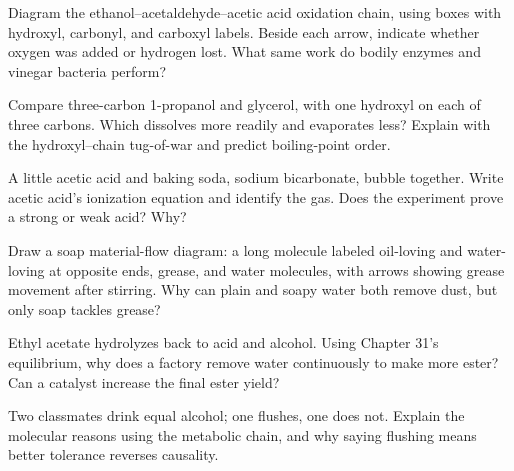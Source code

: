 \begin{sikaoti}
\item Diagram the ethanol--acetaldehyde--acetic acid oxidation chain, using boxes with hydroxyl, carbonyl, and carboxyl labels. Beside each arrow, indicate whether oxygen was added or hydrogen lost. What same work do bodily enzymes and vinegar bacteria perform?
\item Compare three-carbon 1-propanol and glycerol, with one hydroxyl on each of three carbons. Which dissolves more readily and evaporates less? Explain with the hydroxyl--chain tug-of-war and predict boiling-point order.
\item A little acetic acid and baking soda, sodium bicarbonate, bubble together. Write acetic acid's ionization equation and identify the gas. Does the experiment prove a strong or weak acid? Why?
\item Draw a soap material-flow diagram: a long molecule labeled oil-loving and water-loving at opposite ends, grease, and water molecules, with arrows showing grease movement after stirring. Why can plain and soapy water both remove dust, but only soap tackles grease?
\item Ethyl acetate hydrolyzes back to acid and alcohol. Using Chapter 31's equilibrium, why does a factory remove water continuously to make more ester? Can a catalyst increase the final ester yield?
\item Two classmates drink equal alcohol; one flushes, one does not. Explain the molecular reasons using the metabolic chain, and why saying flushing means better tolerance reverses causality.
\end{sikaoti}
